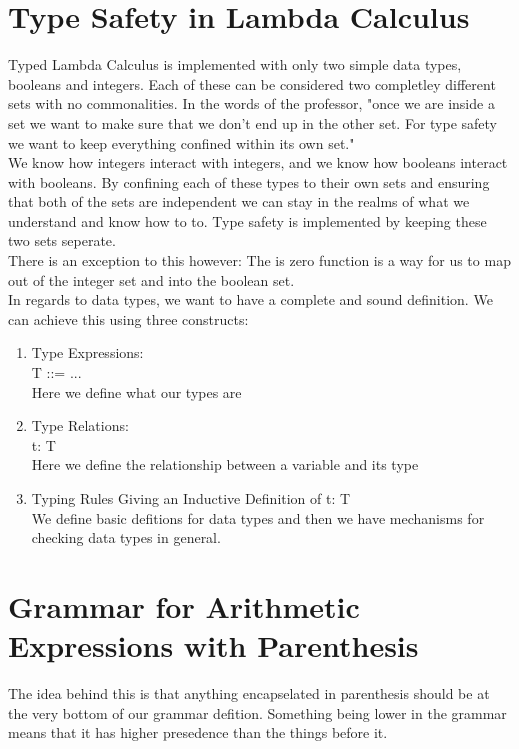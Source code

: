 \documentclass[11pt]{article}
\begin{document}
\newpage
\section{Type Safety in Lambda Calculus}
Typed Lambda Calculus is implemented with only two simple data types, booleans
and integers.  Each of these can be considered two completley different sets
with no commonalities.  In the words of the professor, "once we are inside a
set we want to make sure that we don't end up in the other set. For type safety
we want to keep everything confined within its own set."\\

We know how integers interact with integers, and we know how booleans interact
with booleans.  By confining each of these types to their own sets and
ensuring that both of the sets are independent we can stay in the realms of
what we understand and know how to to.  Type safety is implemented by keeping
these two sets seperate.\\

There is an exception to this however: The is zero function is a way for us to
map out of the integer set and into the boolean set.\\

In regards to data types, we want to have a complete and sound definition.  We
can achieve this using three constructs:\\
\begin{enumerate}
    \item Type Expressions:\\
        T ::= ...\\
        Here we define what our types are

    \item Type Relations:\\
        t: T\\
        Here we define the relationship between a variable and its type

    \item Typing Rules Giving an Inductive Definition of t: T\\
        We define basic defitions for data types and then we have mechanisms
        for checking data types in general.
\end{enumerate}



\newpage
\section{Grammar for Arithmetic Expressions with Parenthesis}
The idea behind this is that anything encapselated in parenthesis should be at
the very bottom of our grammar defition.  Something being lower in the grammar
means that it has higher presedence than the things before it.
\end{document}
